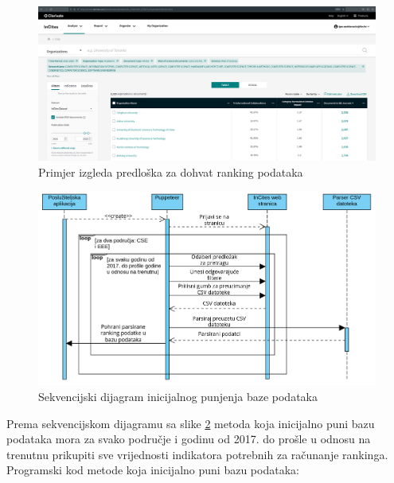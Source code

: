 \documentclass[times, utf8, zavrsni]{fer}
\begin{document}
\begin{figure}[htb]
        \hspace*{-2cm} 
           \includegraphics[scale=0.21]{predlozak.png} 
           \caption{Primjer izgleda predloška za dohvat ranking podataka}
           \label{fig:predlozak}
           \end{figure}  
           \FloatBarrier      
\begin{figure}[htb]
    \centering
       \includegraphics[scale=0.28]{sekvencijski.png} 
       \caption{Sekvencijski dijagram inicijalnog punjenja baze podataka}
       \label{fig:sekvencijski}
       \end{figure}
Prema sekvencijskom dijagramu sa slike \ref{fig:sekvencijski} metoda koja inicijalno puni bazu podataka mora za svako područje i
godinu od 2017. do prošle u odnosu na trenutnu prikupiti sve vrijednosti indikatora potrebnih za računanje rankinga.  
\\Programski kod metode koja inicijalno puni bazu podataka:        
\end{document}
